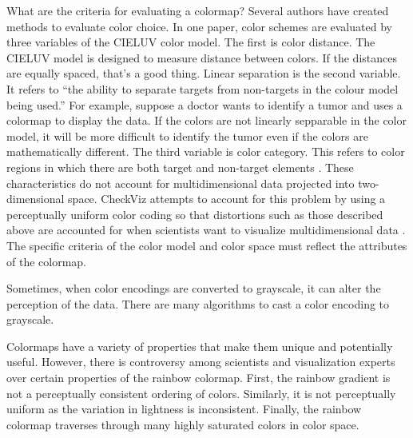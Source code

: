 \documentclass[journal,12pt]{IEEEtran}
\begin{document}
What are the criteria for evaluating a colormap? Several authors have created
methods to evaluate color
choice. In one paper, color schemes are evaluated by
three variables of the CIELUV color model. The first
is color distance. The CIELUV model is designed to
measure distance between colors. If the distances are
equally spaced, that’s a good thing. Linear separation
is the second variable. It refers to “the ability to separate targets
from non-targets in the colour model being
used.” For example, suppose a doctor wants to identify
a tumor and uses a colormap to display the data. If the
colors are not linearly sepparable in the color model, it
will be more difficult to identify the tumor even if the
colors are mathematically different. The third variable
is color category. This refers to color regions in which
there are both target and non-target elements \cite{colorchoice}.
 These characteristics do not account for multidimensional data projected into two-dimensional
space. CheckViz attempts to account for this problem
by using a perceptually uniform color coding so that
distortions such as those described above are accounted for when 
scientists want to visualize multidimensional data \cite{checkviz}.
The specific criteria of the color
model and color space must reflect the attributes of the colormap.
\par
Sometimes, when color encodings are converted to
grayscale, it can alter the perception of the data. There
are many algorithms to cast a color encoding to grayscale.


Colormaps have a variety of properties that make them unique and potentially
useful. However, there is controversy among scientists and visualization
experts over certain properties of the rainbow colormap. First, the rainbow
gradient is not a perceptually consistent ordering of colors. Similarly, it
is not perceptually uniform as the variation in lightness is inconsistent.
Finally, the rainbow colormap traverses through many
highly saturated colors in color space.
\end{document}
